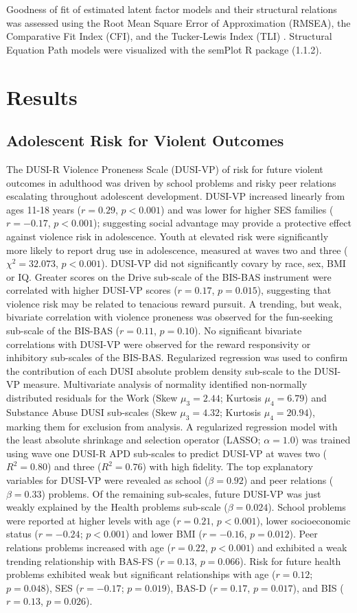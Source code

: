\documentclass[utf8]{article}
\begin{document}
Goodness of fit of estimated latent factor models and their structural relations was assessed using the Root Mean Square Error of Approximation (RMSEA), the Comparative Fit Index (CFI), and the Tucker-Lewis Index (TLI) \citep{KennyEtAl2015,HuTzeBentler1999, wu2009evaluating}. Structural Equation Path models were visualized with the semPlot R package (1.1.2). 
\section*{Results} 
\subsection*{Adolescent Risk for Violent Outcomes} The DUSI-R Violence Proneness Scale (DUSI-VP) of risk for future violent outcomes in adulthood was driven by school problems and risky peer relations escalating throughout adolescent development. DUSI-VP increased linearly from ages 11-18 years ($r=0.29$,  $p<0.001$) and was lower for higher SES families ($r=-0.17$, $p<0.001$); suggesting social advantage may provide a protective effect against violence risk in adolescence. Youth at elevated risk were significantly more likely to report drug use in adolescence, measured at waves two and three ($\chi^2 = 32.073$, $p<0.001$). DUSI-VP did not significantly covary by race, sex, BMI or IQ. Greater scores on the Drive sub-scale of the BIS-BAS instrument were correlated with higher DUSI-VP scores ($r=0.17$, $p=0.015$), suggesting that violence risk may be related to tenacious reward pursuit. A trending, but weak, bivariate correlation with violence proneness was observed for the fun-seeking sub-scale of the BIS-BAS ($r=0.11$, $p=0.10$). No significant bivariate correlations with DUSI-VP were observed for the reward responsivity or inhibitory sub-scales of the BIS-BAS. Regularized regression was used to confirm the contribution of each DUSI absolute problem density sub-scale to the DUSI-VP measure. Multivariate analysis of normality identified non-normally distributed residuals for the Work (Skew $\mu_3=2.44$; Kurtosis $\mu_4=6.79$) and Substance Abuse DUSI sub-scales (Skew $\mu_3=4.32$; Kurtosis $\mu_4=20.94$), marking them for exclusion from analysis. A regularized regression model with the least absolute shrinkage and selection operator (LASSO; $\alpha=1.0$) was trained using wave one DUSI-R APD sub-scales to predict DUSI-VP at waves two ($R^2=0.80$) and three ($R^2=0.76$) with high fidelity. The top explanatory variables for DUSI-VP were revealed as school ($\beta=0.92$) and peer relations ($\beta=0.33$) problems. Of the remaining sub-scales, future DUSI-VP was just weakly explained by the Health problems sub-scale ($\beta=0.024$). School problems were reported at higher levels with age ($r=0.21$, $p<0.001$), lower socioeconomic status ($r=-0.24$; $p<0.001$) and lower BMI ($r=-0.16$, $p=0.012$). Peer relations problems increased with age ($r=0.22$, $p<0.001$) and exhibited a weak trending relationship with BAS-FS ($r=0.13$, $p=0.066$). Risk for future health problems exhibited weak but significant relationships with age ($r=0.12$; $p=0.048$), SES ($r=-0.17$; $p=0.019$), BAS-D ($r=0.17$, $p=0.017$), and BIS ($r=0.13$, $p=0.026$). 
\end{document}
